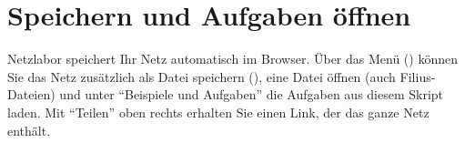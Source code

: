 \section{Speichern und Aufgaben öffnen}
Netzlabor speichert Ihr Netz automatisch im Browser. Über das Menü (\faBars) können Sie das Netz zusätzlich als Datei speichern (), eine Datei öffnen (auch Filius-Dateien) und unter \enquote{Beispiele und Aufgaben} die Aufgaben aus diesem Skript laden. Mit \enquote{Teilen} oben rechts erhalten Sie einen Link, der das ganze Netz enthält.
